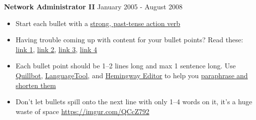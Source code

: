 \documentclass[11pt]{article}       %
\begin{document}
\textbf{Network Administrator II} \hfill January 2005 - August 2008 \\
\vspace{-9pt}
\begin{itemize}
  \item Start each bullet with a \href{https://old.reddit.com/r/EngineeringResumes/wiki/index\#wiki_action_verbs}{\underline{strong, past-tense action verb}}
  \item Having trouble coming up with content for your bullet points? Read these: \href{https://old.reddit.com/r/EngineeringResumes/wiki/index\#wiki_having_trouble_coming_up_with_content_for_your_bullet_points.3F_ask_yourself_the_following_questions.3A}{\underline{link 1}}, \href{https://old.reddit.com/r/EngineeringResumes/wiki/index\#wiki_got_writer.27s_block_from_looking_at_star.2Fcar.2Fxyz.3F}{\underline{link 2}}, \href{https://archive.ph/Xmdqt}{\underline{link 3}}, \href{https://old.reddit.com/r/EngineeringResumes/wiki/sample-bullet-points}{\underline{link 4}}
  \item Each bullet point should be 1--2 lines long and max 1 sentence long. Use \href{https://quillbot.com/}{\underline{Quillbot}}, \href{https://languagetool.org/paraphrasing-tool}{\underline{LanguageTool}}, and \href{https://hemingwayapp.com/}{\underline{Hemingway Editor}} to help you \href{https://www.youtube.com/watch?v=VvPaEsuz-tY}{paraphrase and shorten them}
  \item Don't let bullets spill onto the next line with only 1--4 words on it, it's a huge waste of space \url{https://imgur.com/QCcZ792}
\end{itemize}


\end{document}
